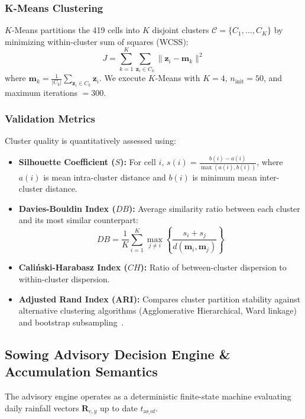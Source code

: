 \documentclass[conference]{IEEEtran}
\begin{document}
\subsubsection{K-Means Clustering}
$K$-Means partitions the 419 cells into $K$ disjoint clusters $\mathcal{C} = \{C_1, \dots, C_K\}$ by minimizing within-cluster sum of squares (WCSS):
\begin{equation}
J = \sum_{k=1}^K \sum_{\mathbf{z}_i \in C_k} \|\mathbf{z}_i - \mathbf{m}_k\|^2
\label{eq:kmeans}
\end{equation}
where $\mathbf{m}_k = \frac{1}{|C_k|}\sum_{\mathbf{z}_i \in C_k} \mathbf{z}_i$. We execute $K$-Means with $K=4$, $n_{\mathrm{init}} = 50$, and maximum iterations $= 300$.

\subsubsection{Validation Metrics}
Cluster quality is quantitatively assessed using:
\begin{itemize}
    \item \textbf{Silhouette Coefficient ($S$):} For cell $i$, $s(i) = \frac{b(i) - a(i)}{\max(a(i), b(i))}$, where $a(i)$ is mean intra-cluster distance and $b(i)$ is minimum mean inter-cluster distance.
    \item \textbf{Davies-Bouldin Index ($DB$):} Average similarity ratio between each cluster and its most similar counterpart:
    \begin{equation}
    DB = \frac{1}{K} \sum_{i=1}^K \max_{j \neq i} \left\{ \frac{s_i + s_j}{d(\mathbf{m}_i, \mathbf{m}_j)} \right\}
    \end{equation}
    \item \textbf{Cali{\'n}ski-Harabasz Index ($CH$):} Ratio of between-cluster dispersion to within-cluster dispersion.
    \item \textbf{Adjusted Rand Index (ARI):} Compares cluster partition stability against alternative clustering algorithms (Agglomerative Hierarchical, Ward linkage) and bootstrap subsampling~\cite{hubert1985comparing}.
\end{itemize}

\subsection{Sowing Advisory Decision Engine & Accumulation Semantics}
The advisory engine operates as a deterministic finite-state machine evaluating daily rainfall vectors $\mathbf{R}_{c,y}$ up to date $t_{\mathrm{as\_of}}$.
\end{document}
